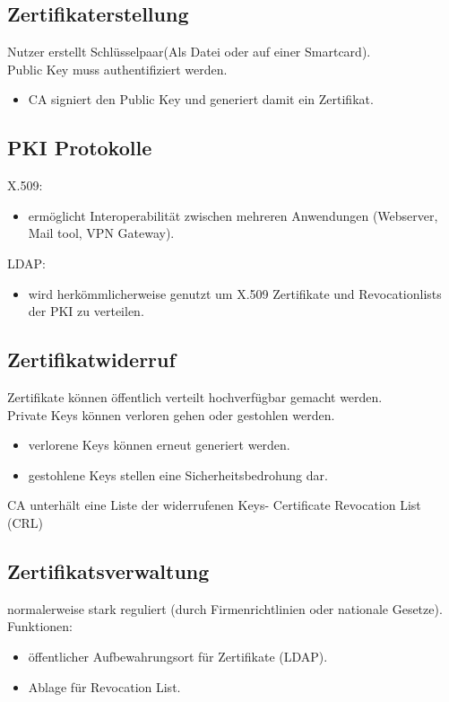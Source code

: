 \documentclass{article} %
\begin{document}
\subsection{Zertifikaterstellung}
Nutzer erstellt Schlüsselpaar(Als Datei oder auf einer Smartcard).\\
Public Key muss authentifiziert werden.
\begin{itemize}
	\item CA signiert den Public Key und generiert damit ein Zertifikat.
\end{itemize}
\subsection{PKI Protokolle}
X.509:
\begin{itemize}
	\item ermöglicht Interoperabilität zwischen mehreren Anwendungen (Webserver, Mail tool, VPN Gateway).
\end{itemize}
LDAP:
\begin{itemize}
	\item wird herkömmlicherweise genutzt um X.509 Zertifikate und Revocationlists der PKI zu verteilen. 
\end{itemize}
\subsection{Zertifikatwiderruf}
Zertifikate können öffentlich verteilt hochverfügbar gemacht werden.\\
Private Keys können verloren gehen oder gestohlen werden.\\
\begin{itemize}
	\item verlorene Keys können erneut generiert werden.
    \item gestohlene Keys stellen eine Sicherheitsbedrohung dar.
\end{itemize}
CA unterhält eine Liste der widerrufenen Keys- Certificate Revocation List (CRL)
\subsection{Zertifikatsverwaltung}
normalerweise stark reguliert (durch Firmenrichtlinien oder nationale Gesetze).\\
Funktionen:
\begin{itemize}
	\item öffentlicher Aufbewahrungsort für Zertifikate (LDAP).
    \item Ablage für Revocation List.
\end{itemize}
\end{document}

